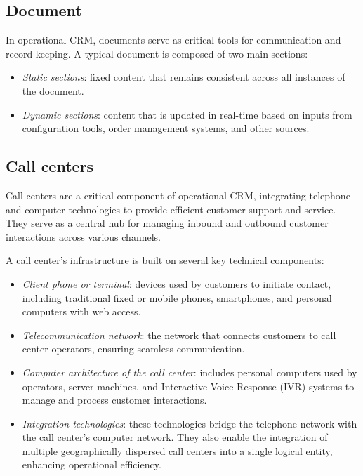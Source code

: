 \subsection{Document}
In operational CRM, documents serve as critical tools for communication and record-keeping. 
A typical document is composed of two main sections:
\begin{itemize}
    \item \textit{Static sections}: fixed content that remains consistent across all instances of the document.
    \item \textit{Dynamic sections}: content that is updated in real-time based on inputs from configuration tools, order management systems, and other sources.
\end{itemize}




\subsection{Call centers}
Call centers are a critical component of operational CRM, integrating telephone and computer technologies to provide efficient customer support and service. 
They serve as a central hub for managing inbound and outbound customer interactions across various channels.

A call center's infrastructure is built on several key technical components:
\begin{itemize}
    \item \textit{Client phone or terminal}: devices used by customers to initiate contact, including traditional fixed or mobile phones, smartphones, and personal computers with web access.
    \item \textit{Telecommunication network}: the network that connects customers to call center operators, ensuring seamless communication.
    \item \textit{Computer architecture of the call center}: includes personal computers used by operators, server machines, and Interactive Voice Response (IVR) systems to manage and process customer interactions.
    \item \textit{Integration technologies}: these technologies bridge the telephone network with the call center's computer network. 
        They also enable the integration of multiple geographically dispersed call centers into a single logical entity, enhancing operational efficiency.
\end{itemize}

